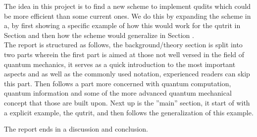The idea in this project is to find a new scheme to implement qudits which could be more efficient than some current ones.  We do this by expanding the scheme in \cite{darkpath} a, by first showing a specific example of how this would work for the qutrit in Section  and then how the scheme would generalize in Section . 
\\
The report is structured as follows, the background/theory section is split into two parts wherein the first part is aimed at those not well versed in the field of quantum mechanics, it serves as a quick introduction to the most important aspects and as well as the commonly used notation, experienced readers can skip this part. Then follows a part more concerned with quantum computation, quantum information and some of the more advanced quantum mechanical concept that those are built upon.
Next up is the ''main'' section, it start of with a explicit example, the qutrit, and then follows the generalization of this example. 

The report ends in a discussion and conclusion.
